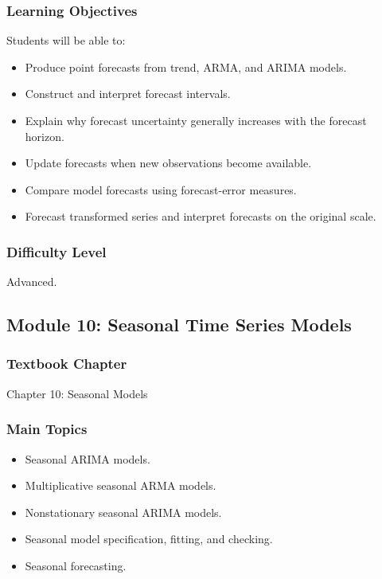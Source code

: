 \documentclass[11pt]{article}
\begin{document}
\subsubsection*{Learning Objectives}
Students will be able to:
\begin{itemize}
    \item Produce point forecasts from trend, ARMA, and ARIMA models.
    \item Construct and interpret forecast intervals.
    \item Explain why forecast uncertainty generally increases with the forecast horizon.
    \item Update forecasts when new observations become available.
    \item Compare model forecasts using forecast-error measures.
    \item Forecast transformed series and interpret forecasts on the original scale.
\end{itemize}

\subsubsection*{Difficulty Level}
Advanced.

\subsection{Module 10: Seasonal Time Series Models}

\subsubsection*{Textbook Chapter}
Chapter 10: Seasonal Models

\subsubsection*{Main Topics}
\begin{itemize}
    \item Seasonal ARIMA models.
    \item Multiplicative seasonal ARMA models.
    \item Nonstationary seasonal ARIMA models.
    \item Seasonal model specification, fitting, and checking.
    \item Seasonal forecasting.
\end{itemize}
\end{document}
